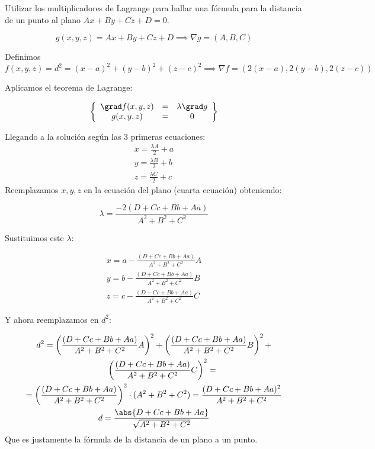 \begin{problem}[18] Utilizar los multiplicadores de Lagrange para hallar una fórmula para la distancia de un punto al plano $Ax+By+Cz+D=0$.

\solution
\[g(x,y,z) = Ax+By+Cz+D \implies \nabla g = (A,B,C)\]

Definimos
\[f(x,y,z) = d^2 = (x-a)^2 + (y-b)^2 + (z-c)^2 \implies \nabla f = (2(x-a),2(y-b),2(z-c))\]

Aplicamos el teorema de Lagrange:

\[\left\{\begin{array}{ccc}
\grad f(x,y,z) & = & \lambda \grad g\\
g(x,y,z) &= & 0
\end{array}\right\}\]

Llegando a la solución según las 3 primeras ecuaciones:
\begin{gather*}
x=\frac{\lambda A}{2} +a\\
y = \frac{\lambda B}{2} +b\\
z = \frac{\lambda C}{2} +c
\end{gather*}
Reemplazamos $x,y,z$ en la ecuación del plano (cuarta ecuación) obteniendo:

\[\lambda = \frac{-2(D+Cc+Bb+Aa)}{A^2+B^2+C^2}\]

Sustituimos este $\lambda$:

\begin{gather*}
x=a-\frac{(D+Cc+Bb+Aa)}{A^2+B^2+C^2} A \\
y = b- \frac{(D+Cc+Bb+Aa)}{A^2+B^2+C^2} B\\
z = c - \frac{(D+Cc+Bb+Aa)}{A^2+B^2+C^2} C
\end{gather*}

Y ahora reemplazamos en $d^2$:

\begin{gather*}
d^2 = \left(\frac{(D+Cc+Bb+Aa)}{A^2+B^2+C^2} A\right)^2 + \left(\frac{(D+Cc+Bb+Aa)}{A^2+B^2+C^2} B\right)^2 + \\
\qquad \left(\frac{(D+Cc+Bb+Aa)}{A^2+B^2+C^2} C\right)^2 = \\
 = \left(\frac{(D+Cc+Bb+Aa)}{A^2+B^2+C^2}\right)^2 \cdot (A^2+B^2+C^2) =\frac{(D+Cc+Bb+Aa)^2}{A^2+B^2+C^2} \\
  d=\frac{\abs{D+Cc+Bb+Aa}}{\sqrt{A^2+B^2+C^2}}
\end{gather*}
Que es justamente la fórmula de la distancia de un plano a un punto.

\end{problem}


